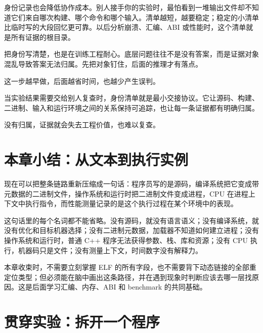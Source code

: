 身份记录也会降低协作成本。别人接手你的实验时，最怕看到一堆输出文件却不知道它们来自哪次构建、哪个命令和哪个输入。清单越短，越要稳定；稳定的小清单比临时写的大段回忆更可靠。以后分析崩溃、汇编、ABI 或性能时，这个清单就是所有证据的根目录。

把身份写清楚，也是在训练工程耐心。底层问题往往不是没有答案，而是证据对象混乱导致答案无法归属。先把对象钉住，后面的推理才有落点。

这一步越早做，后面越省时间，也越少产生误判。

当实验结果需要交给别人复查时，身份清单就是最小交接协议。它让源码、构建、二进制、输入和运行环境之间的关系保持可追踪，也让每一条证据都有明确归属。

没有归属，证据就会失去工程价值，也难以复查。

\section{本章小结：从文本到执行实例}

现在可以把整条链路重新压缩成一句话：程序员写的是源码，编译系统把它变成带元数据的二进制文件，操作系统和运行时把二进制文件变成进程，CPU 在进程上下文中执行指令，而性能测量记录的是这个执行过程在某个环境中的表现。

这句话里的每个名词都不能省略。没有源码，就没有语言语义；没有编译系统，就没有优化和目标机器选择；没有二进制元数据，加载器不知道如何建立进程；没有操作系统和运行时，普通 C++ 程序无法获得参数、栈、库和资源；没有 CPU 执行，机器码只是文件；没有测量上下文，时间数字没有解释力。

本章收束时，不需要立刻掌握 ELF 的所有字段，也不需要背下动态链接的全部重定位类型；但必须能在脑中画出这条路径，并在遇到现象时判断应该去哪一层找原因。这是后面学习汇编、内存、ABI 和 benchmark 的共同基础。

\section{贯穿实验：拆开一个程序}


